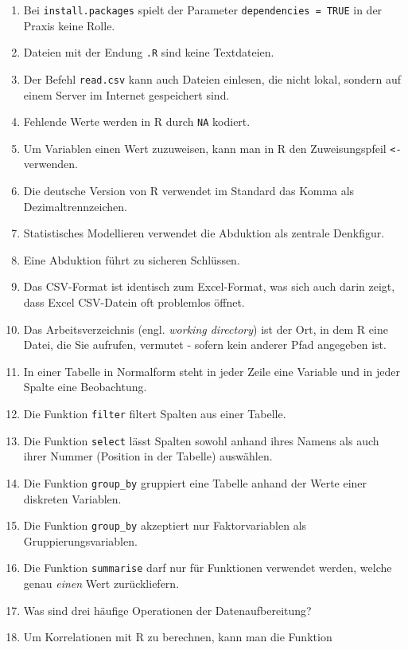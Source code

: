 \documentclass[12pt,ngerman,]{book}
\theoremstyle{definition}
\theoremstyle{definition}
\theoremstyle{remark}
\begin{document}
\begin{enumerate}
\def\labelenumi{\arabic{enumi}.}
\item
  Bei \texttt{install.packages} spielt der Parameter
  \texttt{dependencies\ =\ TRUE} in der Praxis keine Rolle.
\item
  Dateien mit der Endung \texttt{.R} sind keine Textdateien.
\item
  Der Befehl \texttt{read.csv} kann auch Dateien einlesen, die nicht
  lokal, sondern auf einem Server im Internet gespeichert sind.
\item
  Fehlende Werte werden in R durch \texttt{NA} kodiert.
\item
  Um Variablen einen Wert zuzuweisen, kann man in R den Zuweisungspfeil
  \texttt{\textless{}-} verwenden.
\item
  Die deutsche Version von R verwendet im Standard das Komma als
  Dezimaltrennzeichen.
\item
  Statistisches Modellieren verwendet die Abduktion als zentrale
  Denkfigur.
\item
  Eine Abduktion führt zu sicheren Schlüssen.
\item
  Das CSV-Format ist identisch zum Excel-Format, was sich auch darin
  zeigt, dass Excel CSV-Datein oft problemlos öffnet.
\item
  Das Arbeitsverzeichnis (engl. \emph{working directory}) ist der Ort,
  in dem R eine Datei, die Sie aufrufen, vermutet - sofern kein anderer
  Pfad angegeben ist.
\item
  In einer Tabelle in Normalform steht in jeder Zeile eine Variable und
  in jeder Spalte eine Beobachtung.
\item
  Die Funktion \texttt{filter} filtert Spalten aus einer Tabelle.
\item
  Die Funktion \texttt{select} lässt Spalten sowohl anhand ihres Namens
  als auch ihrer Nummer (Position in der Tabelle) auswählen.
\item
  Die Funktion \texttt{group\_by} gruppiert eine Tabelle anhand der
  Werte einer diskreten Variablen.
\item
  Die Funktion \texttt{group\_by} akzeptiert nur Faktorvariablen als
  Gruppierungsvariablen.
\item
  Die Funktion \texttt{summarise} darf nur für Funktionen verwendet
  werden, welche genau \emph{einen} Wert zurückliefern.
\item
  Was sind drei häufige Operationen der Datenaufbereitung?
\item
  Um Korrelationen mit R zu berechnen, kann man die Funktion

\end{enumerate}
\end{document}
